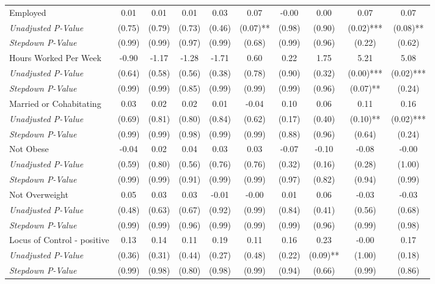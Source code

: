 \begin{tabular}{l c c c c c c c c c}
Employed & 0.01 & 0.01 & 0.01 & 0.03 & 0.07 & -0.00 & 0.00 & 0.07 & 0.07 \\
\quad \textit{Unadjusted P-Value} & (0.75) & (0.79) & (0.73) & (0.46) & (0.07)** & (0.98) & (0.90) & (0.02)*** & (0.08)** \\
\quad \textit{Stepdown P-Value} & (0.99) & (0.99) & (0.97) & (0.99) & (0.68) & (0.99) & (0.96) & (0.22) & (0.62) \\
Hours Worked Per Week & -0.90 & -1.17 & -1.28 & -1.71 & 0.60 & 0.22 & 1.75 & 5.21 & 5.08 \\
\quad \textit{Unadjusted P-Value} & (0.64) & (0.58) & (0.56) & (0.38) & (0.78) & (0.90) & (0.32) & (0.00)*** & (0.02)*** \\
\quad \textit{Stepdown P-Value} & (0.99) & (0.99) & (0.85) & (0.99) & (0.99) & (0.99) & (0.96) & (0.07)** & (0.24) \\
Married or Cohabitating & 0.03 & 0.02 & 0.02 & 0.01 & -0.04 & 0.10 & 0.06 & 0.11 & 0.16 \\
\quad \textit{Unadjusted P-Value} & (0.69) & (0.81) & (0.80) & (0.84) & (0.62) & (0.17) & (0.40) & (0.10)** & (0.02)*** \\
\quad \textit{Stepdown P-Value} & (0.99) & (0.99) & (0.98) & (0.99) & (0.99) & (0.88) & (0.96) & (0.64) & (0.24) \\
Not Obese & -0.04 & 0.02 & 0.04 & 0.03 & 0.03 & -0.07 & -0.10 & -0.08 & -0.00 \\
\quad \textit{Unadjusted P-Value} & (0.59) & (0.80) & (0.56) & (0.76) & (0.76) & (0.32) & (0.16) & (0.28) & (1.00) \\
\quad \textit{Stepdown P-Value} & (0.99) & (0.99) & (0.91) & (0.99) & (0.99) & (0.97) & (0.82) & (0.94) & (0.99) \\
Not Overweight & 0.05 & 0.03 & 0.03 & -0.01 & -0.00 & 0.01 & 0.06 & -0.03 & -0.03 \\
\quad \textit{Unadjusted P-Value} & (0.48) & (0.63) & (0.67) & (0.92) & (0.99) & (0.84) & (0.41) & (0.56) & (0.68) \\
\quad \textit{Stepdown P-Value} & (0.99) & (0.99) & (0.96) & (0.99) & (0.99) & (0.99) & (0.96) & (0.99) & (0.98) \\
Locus of Control - positive & 0.13 & 0.14 & 0.11 & 0.19 & 0.11 & 0.16 & 0.23 & -0.00 & 0.17 \\
\quad \textit{Unadjusted P-Value} & (0.36) & (0.31) & (0.44) & (0.27) & (0.48) & (0.22) & (0.09)** & (1.00) & (0.18) \\
\quad \textit{Stepdown P-Value} & (0.99) & (0.98) & (0.80) & (0.98) & (0.99) & (0.94) & (0.66) & (0.99) & (0.86) \\

\end{tabular}
